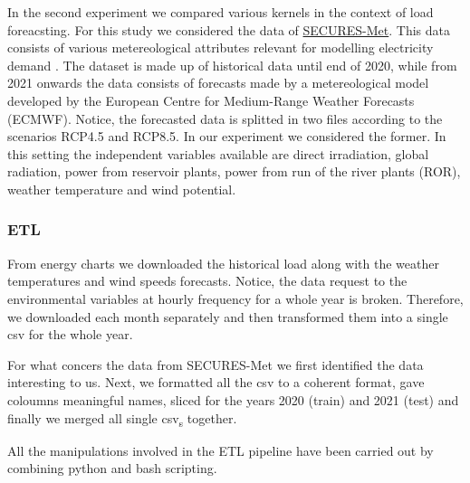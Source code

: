 In the second experiment we compared various kernels in the context of load foreacsting.
For this study we considered the data of \href{https://zenodo.org/records/7907883}{SECURES-Met}. This data consists of various metereological attributes relevant for modelling electricity demand \cite{Formayer2023}. The dataset is made up of historical data until end of 2020, while from 2021 onwards the data consists of forecasts made by a metereological model developed by the European Centre for Medium-Range Weather Forecasts (ECMWF). Notice, the forecasted data is splitted in two files according to the scenarios RCP4.5 and RCP8.5. In our experiment we considered the former. 
In this setting the independent variables available are 
direct irradiation, global radiation, power from reservoir plants, power from run of the river plants (ROR), weather temperature and wind potential.

\subsubsection{ETL}
From energy charts we downloaded the historical load along with the weather temperatures and wind speeds forecasts. Notice, the data request to the environmental variables at hourly frequency for a whole year is broken. Therefore, we downloaded each month separately and then transformed them into a single csv for the whole year.

For what concers the data from SECURES-Met we first identified the data interesting to us. Next, we formatted all the csv to a coherent format, gave coloumns meaningful names, sliced for the years 2020 (train) and 2021 (test) and finally we merged all single csv\textsubscript{s} together.

All the manipulations involved in the ETL pipeline have been carried out by combining python and bash scripting. 

